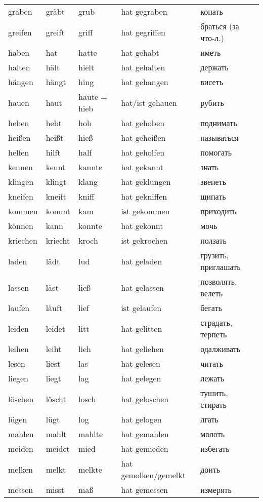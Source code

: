 \begin{longtable}{|l|l|l|l|l|}
graben & gr\"abt & grub & hat gegraben & копать \\
greifen & greift & griff & hat gegriffen & браться (за что-л.) \\
haben & hat & hatte & hat gehabt & иметь \\
halten & h\"alt & hielt & hat gehalten & держать \\
h\"angen & h\"angt & hing & hat gehangen & висеть \\
hauen & haut & haute = hieb & hat/ist gehauen & рубить \\
heben & hebt & hob & hat gehoben & поднимать \\
hei\ss en & hei\ss t & hie\ss  & hat gehei\ss en & называться \\
helfen & hilft & half & hat geholfen & помогать \\
kennen & kennt & kannte & hat gekannt & знать \\
klingen & klingt & klang & hat geklungen & звенеть \\
kneifen & kneift & kniff & hat gekniffen & щипать \\
kommen & kommt & kam & ist gekommen & приходить \\
k\"onnen & kann & konnte & hat gekonnt & мочь \\
kriechen & kriecht & kroch & ist gekrochen & ползать \\
laden & l\"adt & lud & hat geladen & грузить, приглашать \\
lassen & l\"ast & lie\ss  & hat gelassen & позволять, велеть \\
laufen & l\"auft & lief & ist gelaufen & бегать \\
leiden & leidet & litt & hat gelitten & страдать, терпеть \\
leihen & leiht & lieh & hat geliehen & одалживать \\
lesen & liest & las & hat gelesen & читать \\
liegen & liegt & lag & hat gelegen & лежать \\
l\"oschen & l\"oscht & losch & hat geloschen & тушить, стирать \\
l\"ugen & l\"ugt & log & hat gelogen & лгать \\
mahlen & mahlt & mahlte & hat gemahlen & молоть \\
meiden & meidet & mied & hat gemieden & избегать \\
melken & melkt & melkte & hat gemolken/gemelkt & доить \\
messen & misst & ma\ss  & hat gemessen & измерять \\

\end{longtable}
